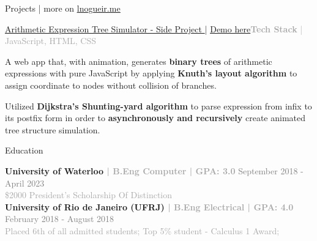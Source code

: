 \documentclass[hidelinks]{resume} %
\begin{document}
\begin{rSection}{\faRocket \hspace{0.25px} Projects | \small{more on \href{\website}{\underline{lnogueir.me}}}}

\begin{rSubsection}{\href{https://github.com/lnogueir/expression-tree-gen}{Arithmetic Expression Tree Simulator - Side Project \faGithub} |
\href{https://lnogueir.github.io/expression-tree-gen/}{\underline{Demo here}}}{\textcolor{darkgray}{\textbf{Tech Stack} | JavaScript, HTML, CSS}}{}
\par
    \begin{bulletpoints}
    \vspace{-.10cm}
        \item A web app that, with animation, generates \textbf{binary trees} of arithmetic expressions with pure JavaScript by applying \textbf{Knuth's layout algorithm} to assign coordinate to nodes without collision of branches.
        \vspace{-.13cm}
        \item Utilized \textbf{Dijkstra's Shunting-yard algorithm} to parse expression from infix to its postfix form in order to \textbf{asynchronously and recursively} create animated tree structure simulation.
        \vspace{-.25cm}
    \end{bulletpoints}
\end{rSubsection}

\vspace{.05cm}
\begin{rSection}{\faGraduationCap \hspace{0.25px} Education}

{\bf University of Waterloo \textcolor{darkgray}{| B.Eng Computer | GPA: 3.0}} \hfill {\textcolor{gray}{September 2018 - April 2023}} 
\\ \textcolor{darkgray}{\$2000 President's Scholarship Of Distinction}
\vspace{5px}
\\{\bf University of Rio de Janeiro (UFRJ) \textcolor{darkgray}{| B.Eng Electrical | GPA: 4.0}} \hfill {\textcolor{gray}{February 2018 - August 2018}} 
\\ \textcolor{darkgray}{ Placed 6th of all admitted students; Top 5\% student - Calculus 1 Award;}\hfill
\vspace{.1cm}
\end{rSection}



\end{rSection}






\end{document}
